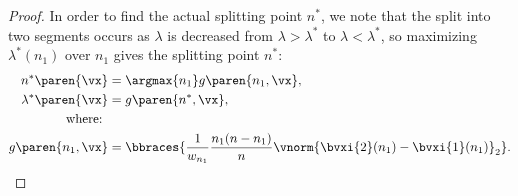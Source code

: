 \begin{proof}
In order to find the actual splitting point $n^*$, we note that the split into two segments occurs as $\lambda$ is decreased
from $\lambda>\lambda^*$ to $\lambda<\lambda^*$, so maximizing $\lambda^*(n_1)$ over $n_1$ gives the splitting point $n^*$:
\begin{align*}%
    n^*\paren{\vx} &= \argmax{n_1}g\paren{n_1,\vx},\\ %
    \lambda^*\paren{\vx} &= g\paren{n^*,\vx},\nonumber \\
    \textrm{ where: }\\
    g\paren{n_1,\vx} &= \bbraces{\frac{1}{w_{n_1}}\frac{n_1(n-n_1)}{n}\vnorm{\bvxi{2}(n_1)-\bvxi{1}(n_1)}_2}.\nonumber
\end{align*}
\end{proof}\QED
